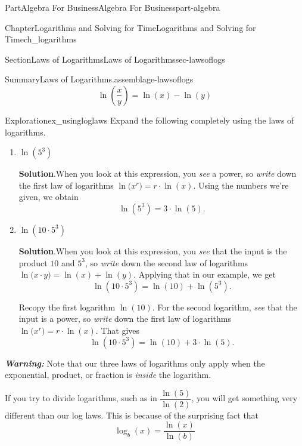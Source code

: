 \documentclass[oneside,10pt,]{tufte-book}
\newcommand{\blocktitlefont}{\relax}
\newcommand{\alert}[1]{\textbf{\textit{#1}}}
\numberwithin{equation}{chapter}
\begin{document}
\begin{partptx}{Part}{Algebra For Business}{}{Algebra For Business}{}{}{part-algebra}
\begin{chapterptx}{Chapter}{Logarithms and Solving for Time}{}{Logarithms and Solving for Time}{}{}{ch_logarithms}
\begin{sectionptx}{Section}{Laws of Logarithms}{}{Laws of Logarithms}{}{}{sec-lawsoflogs}
\begin{assemblage}{Summary}{Laws of Logarithms.}{assemblage-lawsoflogs}
%
\begin{equation*}
\ln\left( \dfrac{x}{y} \right)= \ln(x) - \ln(y)
\end{equation*}
%
\end{assemblage}
\begin{exploration}{Exploration}{}{ex_usingloglaws}%
Expand the following completely using the laws of logarithms.%
\begin{enumerate}[font=\bfseries,label=(\alph*),ref=\alph*]%
\item{}\(\ln(5^3)\)%
\par\smallskip%
\noindent\textbf{\blocktitlefont Solution}.\hypertarget{ex_usingloglaws-2-2}{}\quad{}When you look at this expression, you \emph{see} a power, so \emph{write} down the first law of logarithms \(\ln\Big( x^r \Big)= r\cdot \ln(x)\).  Using the numbers we're given, we obtain%
\begin{equation*}
\ln(5^3) = 3\cdot \ln(5)\text{.}
\end{equation*}
%
\item{}\(\ln(10\cdot 5^3) \)%
\par\smallskip%
\noindent\textbf{\blocktitlefont Solution}.\hypertarget{ex_usingloglaws-3-2}{}\quad{}When you look at this expression, you \emph{see} that the input is the product \(10\) and \(5^3\), so \emph{write} down the second law of logarithms \(\ln\Big( x\cdot y \Big)= \ln(x) + \ln(y)\).   Applying that in our example, we get%
\begin{equation*}
\ln(10\cdot 5^3) = \ln(10) + \ln( 5^3 )\text{.}
\end{equation*}
%
\par
Recopy the first logarithm \(\ln(10)\). For the second logarithm, \emph{see} that the input is a power, so \emph{write} down the first law of logarithms \(\ln\Big( x^r \Big)= r\cdot \ln(x)\).  That gives%
\begin{equation*}
\ln(10\cdot 5^3) = \ln(10) + 3\cdot \ln( 5 )\text{.}
\end{equation*}
%
\end{enumerate}%
\end{exploration}%
\alert{Warning:} Note that our three laws of logarithms only apply when the exponential, product, or fraction is \emph{inside} the logarithm.%
\par
If you try to divide logarithms, such as in \(\dfrac{\ln(5)}{\ln(2)}\), you will get something very different than our log laws. This is because of the surprising fact that%
\begin{equation*}
\log_b(x) = \dfrac{\ln(x)}{\ln(b)}

\end{equation*}
\end{sectionptx}
\end{chapterptx}
\end{partptx}
\end{document}
